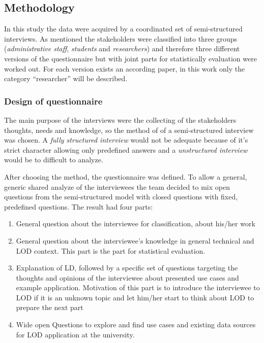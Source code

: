 \subsection{Methodology}
In this study the data were acquired by a coordinated set of semi-structured interviews. As mentioned the stakeholders were classified into three groups (\textit{administrative staff}, \textit{students} and \textit{researchers}) and therefore three different versions of the questionnaire but with joint parts for statistically evaluation were worked out. For each version exists an according paper, in this work only the category "`researcher"' will be described.

\subsubsection{Design of questionnaire}
The main purpose of the interviews were the collecting of the stakeholders thoughts, needs and knowledge, so the method of of a semi-structured interview was chosen. A \textit{fully structured interview} would not be adequate because of it's strict character allowing only predefined answers and a \textit{unstructured interview} would be to difficult to analyze.

After choosing the method, the questionnaire was defined. To allow a general, generic shared analyze of the interviewees the team decided to mix open questions from the semi-structured model with closed questions with fixed, predefined questions. The result had four parts:

\begin{enumerate}
	\item General question about the interviewee for classification, about his/her work
	\item General question about the interviewee's knowledge in general technical and LOD context. This part is the part for statistical evaluation.
	\item Explanation of LD, followed by a specific set of questions targeting the thoughts and opinions of the interviewee about presented use cases and example application. Motivation of this part is to introduce the interviewee to LOD if it is an unknown topic and let him/her start to think about LOD to prepare the next part
	\item Wide open Questions to explore and find use cases and existing data sources for LOD application at the university.
\end{enumerate}


